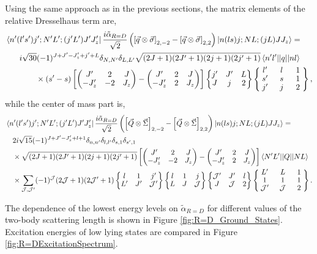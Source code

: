 \documentclass[%
 preprint,
 amsmath,amssymb,
 aps,
]{revtex4-1}
\newcommand{\threej}[6]{ \begin{pmatrix}
  #1 & #2 & #3 \\
  #4 & #5 & #6 
 \end{pmatrix}}
\newcommand{\sixj}[6]{ \begin{Bmatrix}
  #1 & #2 & #3 \\
  #4 & #5 & #6 
 \end{Bmatrix}}
\newcommand{\ninej}[9]{ \begin{Bmatrix}
  #1 & #2 & #3 \\
  #4 & #5 & #6 \\
  #7 & #8 & #9
 \end{Bmatrix}}
\begin{document}
Using the same approach as in the previous sections, the matrix elements of the relative Dresselhaus term are,
\begin{equation}\begin{split}
&\bra{n'(l's')j';N'L';(j'L')J'J'_z} \frac{i \tilde{\alpha}_{R=D}}{\sqrt{2}}\left(  \left[ \vec{q} \otimes \vec{\sigma} \right]_{2,-2} -  \left[ \vec{q} \otimes \vec{\sigma} \right]_{2,2} \right)  \ket{n(ls)j;NL;(jL)JJ_z} = \\
 &\quad\hphantom{\times} i \sqrt{30}(-1)^{J+J'-J'_z+j'+L}\delta_{N,N'}\delta_{L,L'} \sqrt{(2J+1)(2J'+1)(2j+1)(2j'+1)}  \braket{n'l' || q || n l}\\
 &\hspace{1cm}\quad \times(s'-s) \left[\threej{J'}{2}{J}{-J'_z}{-2}{J_z}-\threej{J'}{2}{J}{-J'_z}{2}{J_z}\right] \sixj{j'}{J'}{L}{J}{j}{2}
 \renewcommand{\arraystretch}{0.9} \ninej{\hphantom{l}l'\hphantom{l}}{\hphantom{l}l\hphantom{l}}{\hphantom{l}1\hphantom{l}}{s'}{s}{1}{j'}{j}{2},
\end{split}
\end{equation}
while the center of mass part is,
\begin{equation}\begin{split}
&\bra{n'(l's')j';N'L';(j'L')J'J'_z}  \frac{i \tilde{\alpha}_{R=D}}{\sqrt{2}}\left(  \left[ \vec{Q} \otimes \vec{\Sigma} \right]_{2,-2} -  \left[ \vec{Q} \otimes \vec{\Sigma} \right]_{2,2} \right)  \ket{n(ls)j;NL;(jL)JJ_z} =  \\
&\quad2 i \sqrt{15}(-1)^{J+J'-J'_z+l+1}\delta_{n,n'}\delta_{l,l'}\delta_{s,1}\delta_{s',1}  \\
 &\quad\times \sqrt{(2J+1)(2J'+1)(2j+1)(2j'+1)} \left[\threej{J'}{2}{J}{-J'_z}{-2}{J_z}-\threej{J'}{2}{J}{-J'_z}{2}{J_z}\right] \braket{N' L' || Q || N L} \\ 
 &\quad\times\sum_{\mathcal{J},\mathcal{J}'} (-1)^\mathcal{J}(2\mathcal{J}+1)(2\mathcal{J}'+1)\sixj{l}{1}{j'}{L'}{J'}{\mathcal{J}'}\sixj{l}{1}{j}{L}{J}{\mathcal{J}}\sixj{\mathcal{J}'}{J'}{l}{J}{\mathcal{J}}{2}
 \renewcommand{\arraystretch}{0.9}
 \ninej{\hphantom{l}L'\hphantom{l}}{\hphantom{l}L\hphantom{l}}{\hphantom{l}1\hphantom{l}}{1}{1}{1}{\mathcal{J}'}{\mathcal{J}}{2} .
\end{split}
\end{equation}

The dependence of the lowest energy levels on $\tilde{\alpha}_{R=D}$ for different values of the two-body scattering length is shown in Figure \ref{fig:R=D_Ground_States}. Excitation energies of low lying states are compared in Figure \ref{fig:R=DExcitationSpectrum}.
\end{document}
